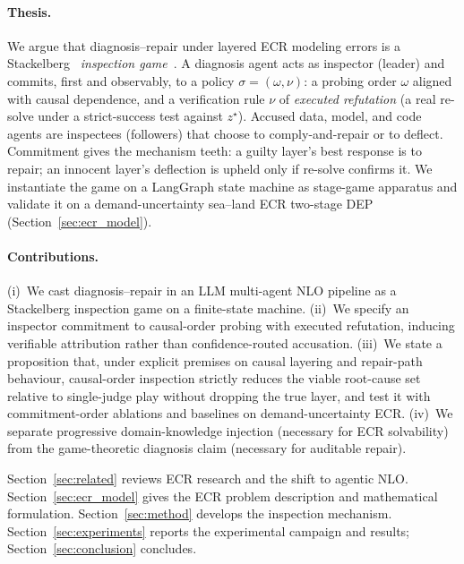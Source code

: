 \documentclass[a4paper,fleqn]{cas-sc}
\begin{document}
\paragraph{Thesis.}
We argue that diagnosis--repair under layered ECR modeling errors is a
Stackelberg~\citep{stackelberg1952} \emph{inspection
game}~\citep{avenhaus2002inspection,maschler1966inspection}.
A diagnosis agent acts as inspector (leader) and commits, first and
observably, to a policy $\sigma=(\omega,\nu)$: a probing order $\omega$
aligned with causal dependence, and a verification rule $\nu$ of
\emph{executed refutation} (a real re-solve under a strict-success test
against $z^{\star}$). Accused data, model, and code agents are inspectees
(followers) that choose to comply-and-repair or to deflect. Commitment
gives the mechanism teeth: a guilty layer's best response is to repair; an
innocent layer's deflection is upheld only if re-solve confirms it. We
instantiate the game on a LangGraph state machine as stage-game apparatus
and validate it on a demand-uncertainty sea--land ECR two-stage DEP
(Section~\ref{sec:ecr_model}).

\paragraph{Contributions.}
(i)~We cast diagnosis--repair in an LLM multi-agent NLO pipeline as a
Stackelberg inspection game on a finite-state machine.
(ii)~We specify an inspector commitment to causal-order probing with
executed refutation, inducing verifiable attribution rather than
confidence-routed accusation.
(iii)~We state a proposition that, under explicit premises on causal
layering and repair-path behaviour, causal-order inspection strictly
reduces the viable root-cause set relative to single-judge play without
dropping the true layer, and test it with commitment-order ablations and
baselines on demand-uncertainty ECR.
(iv)~We separate progressive domain-knowledge injection (necessary for ECR
solvability) from the game-theoretic diagnosis claim (necessary for
auditable repair).

Section~\ref{sec:related} reviews ECR research and the shift to agentic
NLO. Section~\ref{sec:ecr_model} gives the ECR problem description and
mathematical formulation.
Section~\ref{sec:method} develops the inspection mechanism.
Section~\ref{sec:experiments} reports the experimental campaign and
results; Section~\ref{sec:conclusion} concludes.

\end{document}
